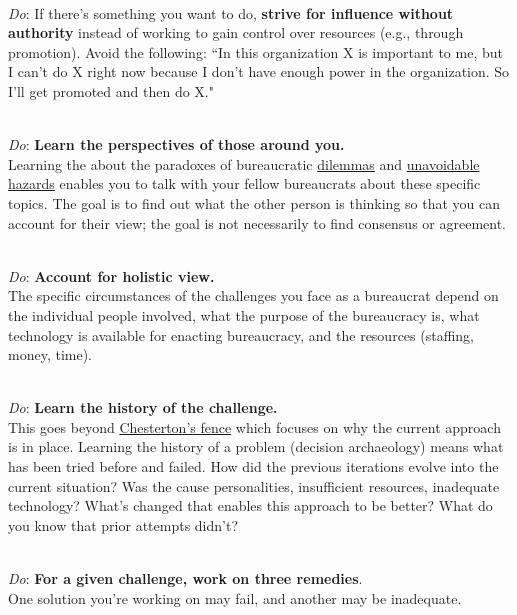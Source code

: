 \ \\
\textit{Do}: If there's something you want to do, \textbf{strive for influence without authority} instead of working to gain control over resources (e.g., through promotion). Avoid the following: ``In this organization X is important to me, but I can't do X right now because I don't have enough power in the organization. So I'll get promoted and then do X."

\ \\
\textit{Do}: \textbf{Learn the perspectives of those around you.}\\
Learning the about the paradoxes of bureaucratic \hyperref[sec:dilemma-trilemma]{dilemmas} and \hyperref[sec:unavoidable-hazards]{unavoidable hazards} enables you to talk with your fellow bureaucrats about these specific topics. 
The goal is to find out what the other person is thinking so that you can account for their view; the goal is not necessarily to find consensus or agreement. 

\ \\
\textit{Do}: \textbf{Account for holistic view.}\\
The specific circumstances of the challenges you face as a bureaucrat depend on the individual people involved, what the purpose of the bureaucracy is, what technology is available for enacting bureaucracy, and the resources (staffing, money, time). 

\ \\
\textit{Do}: \textbf{Learn the history of the challenge.}\\
This goes beyond
\href{https://en.wikipedia.org/wiki/G._K._Chesterton\%23Chesterton's_fence}{Chesterton's fence}\iftoggle{haspagenumbers}{ (see page~\pageref{concept:chestertons_fence}), }{,}%
%
\iftoggle{WPinmargin}{\marginpar{$>$Wikipedia: Chesterton's fence}}{}%
which focuses on why the current approach is in place. Learning the history of a problem (\gls{decision archaeology}) means what has been tried before and failed. How did the previous iterations evolve into the current situation? Was the cause personalities, insufficient resources, inadequate technology? What's changed that enables this approach to be better? What do you know that prior attempts didn't?

\ \\
\textit{Do}: \textbf{For a given challenge, work on three remedies}.\\
One solution you're working on may fail, and another may be inadequate. 

